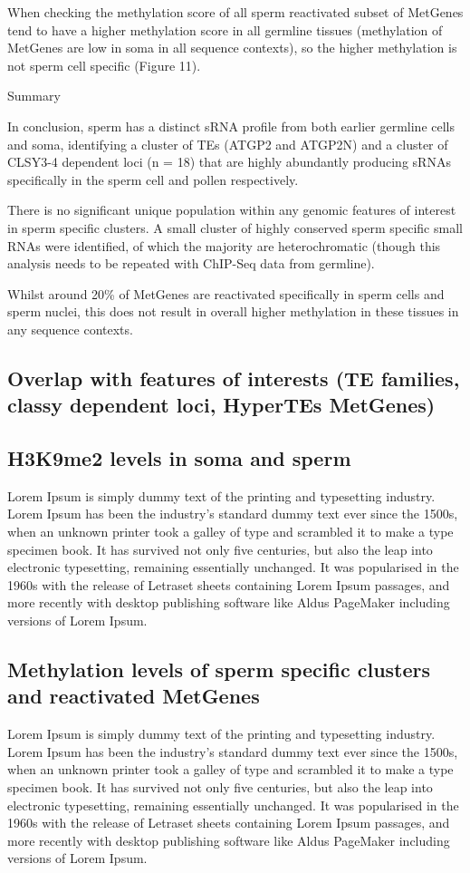 When checking the methylation score of all sperm reactivated subset of MetGenes tend to have a higher methylation score in all germline tissues (methylation of MetGenes are low in soma in all sequence contexts), so the higher methylation is not sperm cell specific (Figure 11).




Summary

In conclusion, sperm has a distinct sRNA profile from both earlier germline cells and soma, identifying a cluster of TEs (ATGP2 and ATGP2N) and a cluster of CLSY3-4 dependent loci (n = 18) that are highly abundantly producing sRNAs specifically in the sperm cell and pollen respectively.

There is no significant unique population within any genomic features of interest in sperm specific clusters. A small cluster of highly conserved sperm specific small RNAs were identified, of which the majority are heterochromatic (though this analysis needs to be repeated with ChIP-Seq data from germline).

Whilst around 20\% of MetGenes are reactivated specifically in sperm cells and sperm nuclei, this does not result in overall higher methylation in these tissues in any sequence contexts.


\subsection{Overlap with features of interests (TE families, classy dependent loci, HyperTEs MetGenes)}

\subsection{H3K9me2 levels in soma and sperm}
Lorem Ipsum is simply dummy text of the printing and typesetting industry. Lorem Ipsum has been the industry's standard dummy text ever since the 1500s, when an unknown printer took a galley of type and scrambled it to make a type specimen book. It has survived not only five centuries, but also the leap into electronic typesetting, remaining essentially unchanged. It was popularised in the 1960s with the release of Letraset sheets containing Lorem Ipsum passages, and more recently with desktop publishing software like Aldus PageMaker including versions of Lorem Ipsum.

\subsection{Methylation levels of sperm specific clusters and reactivated MetGenes}
Lorem Ipsum is simply dummy text of the printing and typesetting industry. Lorem Ipsum has been the industry's standard dummy text ever since the 1500s, when an unknown printer took a galley of type and scrambled it to make a type specimen book. It has survived not only five centuries, but also the leap into electronic typesetting, remaining essentially unchanged. It was popularised in the 1960s with the release of Letraset sheets containing Lorem Ipsum passages, and more recently with desktop publishing software like Aldus PageMaker including versions of Lorem Ipsum.

